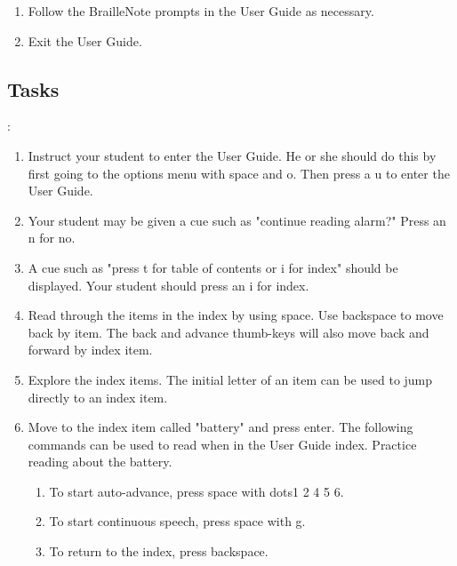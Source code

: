 \documentclass[10pt,letterpaper,twoside]{report}
\begin{document}
{{{{\begin{enumerate}
	\item Follow the BrailleNote prompts in the User Guide as necessary.
	      
	\item Exit the User Guide.
\end{enumerate}



 \subsection{Tasks}:



\begin{enumerate}
	\item Instruct your student to enter the User Guide.  He or she should do this by first going to the options menu with space and o.  Then press a u to enter the User Guide.
	      
	\item Your student may be given a cue such as "continue reading alarm?" Press an n for no.
	      
	\item A cue such as "press t for table of contents or i for index" should be displayed.  Your student should press an i for index.
	      
	\item Read through the items in the index by using space.  Use backspace to move back by item.  The back and advance thumb-keys will also move back and forward by index item.
	      
	\item Explore the index items.  The initial letter of an item can be used to jump directly to an index item.
	      
	\item Move to the index item called "battery" and press enter.  The following commands can be used to read when in the User Guide index.  Practice reading about the battery.
	      
	      \begin{enumerate}
		      \item To start auto-advance, press space with dots1 2 4 5 6.
		            
		      \item To start continuous speech, press space with g.
		            
		      \item To return to the index, press backspace.
		            

\end{enumerate}
\end{enumerate}}}}}
\end{document}
